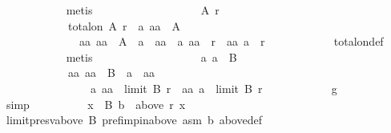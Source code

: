 \begin{isabellebody}
\ \ \ \ \ \ \ \ \ \ \isamarkupfalse%
\ metis\isanewline
\ \ \ \ \ \ \ \ \isamarkupfalse%
\isanewline
\ \ \ \ \ \ \ \ \ \ {\isachardoublequoteopen}{\isasymforall}A\ r{\isachardot}{\kern0pt}\isanewline
\ \ \ \ \ \ \ \ \ \ \ \ total{\isacharunderscore}{\kern0pt}on\ A\ r\ {\isacharequal}{\kern0pt}\ {\isacharparenleft}{\kern0pt}{\isasymforall}a{\isachardot}{\kern0pt}\ {\isacharparenleft}{\kern0pt}a{\isacharcolon}{\kern0pt}{\isacharcolon}{\kern0pt}{\isacharprime}{\kern0pt}a{\isacharparenright}{\kern0pt}\ {\isasymnotin}\ A\ {\isasymor}\isanewline
\ \ \ \ \ \ \ \ \ \ \ \ \ \ {\isacharparenleft}{\kern0pt}{\isasymforall}aa{\isachardot}{\kern0pt}\ {\isacharparenleft}{\kern0pt}aa\ {\isasymnotin}\ A\ {\isasymor}\ a\ {\isacharequal}{\kern0pt}\ aa{\isacharparenright}{\kern0pt}\ {\isasymor}\ {\isacharparenleft}{\kern0pt}a{\isacharcomma}{\kern0pt}\ aa{\isacharparenright}{\kern0pt}\ {\isasymin}\ r\ {\isasymor}\ {\isacharparenleft}{\kern0pt}aa{\isacharcomma}{\kern0pt}\ a{\isacharparenright}{\kern0pt}\ {\isasymin}\ r{\isacharparenright}{\kern0pt}{\isacharparenright}{\kern0pt}{\isachardoublequoteclose}\isanewline
\ \ \ \ \ \ \ \ \ \ \isamarkupfalse%
\ total{\isacharunderscore}{\kern0pt}on{\isacharunderscore}{\kern0pt}def\isanewline
\ \ \ \ \ \ \ \ \ \ \isamarkupfalse%
\ metis\isanewline
\ \ \ \ \ \ \ \ \isamarkupfalse%
\isanewline
\ \ \ \ \ \ \ \ \ \ {\isachardoublequoteopen}{\isasymforall}a{\isachardot}{\kern0pt}\ a\ {\isasymnotin}\ B\ {\isasymor}\isanewline
\ \ \ \ \ \ \ \ \ \ \ \ {\isacharparenleft}{\kern0pt}{\isasymforall}aa{\isachardot}{\kern0pt}\ aa\ {\isasymnotin}\ B\ {\isasymor}\ a\ {\isacharequal}{\kern0pt}\ aa\ {\isasymor}\isanewline
\ \ \ \ \ \ \ \ \ \ \ \ \ \ \ \ {\isacharparenleft}{\kern0pt}a{\isacharcomma}{\kern0pt}\ aa{\isacharparenright}{\kern0pt}\ {\isasymin}\ limit\ B\ r\ {\isasymor}\ {\isacharparenleft}{\kern0pt}aa{\isacharcomma}{\kern0pt}\ a{\isacharparenright}{\kern0pt}\ {\isasymin}\ limit\ B\ r{\isacharparenright}{\kern0pt}{\isachardoublequoteclose}\isanewline
\ \ \ \ \ \ \ \ \ \ \isamarkupfalse%
\ g{}\isanewline
\ \ \ \ \ \ \ \ \ \ \isamarkupfalse%
\ simp\isanewline
\ \ \ \ \ \ \ \ \isamarkupfalse%
\ {\isachardoublequoteopen}{\isasymforall}x\ {\isasymin}\ B{\isachardot}{\kern0pt}\ b\ {\isasymin}\ above\ r\ x{\isachardoublequoteclose}\isanewline
\ \ \ \ \ \ \ \ \ \ \isamarkupfalse%
\ limit{\isacharunderscore}{\kern0pt}presv{\isacharunderscore}{\kern0pt}above{}\ B\ pref{\isacharunderscore}{\kern0pt}imp{\isacharunderscore}{\kern0pt}in{\isacharunderscore}{\kern0pt}above\ asm\ b\ above{\isacharunderscore}{\kern0pt}def\isanewline

\end{isabellebody}
